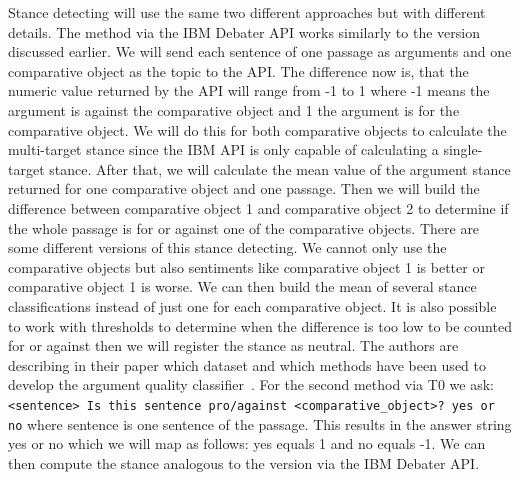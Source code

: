         Stance detecting will use the same two different approaches but with different details. The method via the IBM Debater API works similarly to the version discussed earlier. We will send each sentence of one passage as arguments and one comparative object as the topic to the API. The difference now is, that the numeric value returned by the API will range from -1 to 1 where -1 means the argument is against the comparative object and 1 the argument is for the comparative object. We will do this for both comparative objects to calculate the multi-target stance since the IBM API is only capable of calculating a single-target stance. After that, we will calculate the mean value of the argument stance returned for one comparative object and one passage. Then we will build the difference between comparative object 1 and comparative object 2 to determine if the whole passage is for or against one of the comparative objects. There are some different versions of this stance detecting. We cannot only use the comparative objects but also sentiments like comparative object 1 is better or comparative object 1 is worse. We can then build the mean of several stance classifications instead of just one for each comparative object. It is also possible to work with thresholds to determine when the difference is too low to be counted for or against then we will register the stance as neutral.  The authors \citeauthor{BarHaimBDSS2017} are describing in their paper which dataset and which methods have been used to develop the argument quality classifier~\cite{BarHaimBDSS2017}. For the second method via T0 we ask: \texttt{<sentence> Is this sentence pro/against <comparative\_object>? yes or no} where sentence is one sentence of the passage. This results in the answer string yes or no which we will map as follows: yes equals 1 and no equals -1. We can then compute the stance analogous to the version via the IBM Debater API.
